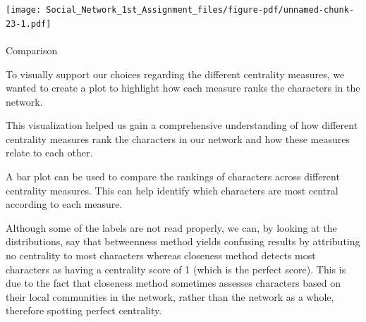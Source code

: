 \documentclass[
  letterpaper,
  DIV=11,
  numbers=noendperiod]{scrartcl}
\makeatletter
\let\oldparagraph\paragraph
\renewcommand{\paragraph}{
    \@ifstar
      \xxxParagraphStar
      \xxxParagraphNoStar
  }
\newcommand{\xxxParagraphStar}[1]{\oldparagraph*{#1}\mbox{}}
\newcommand{\xxxParagraphNoStar}[1]{\oldparagraph{#1}\mbox{}}
\newenvironment{Shaded}{\begin{snugshade}}{\end{snugshade}}
\newcommand{\AttributeTok}[1]{\textcolor[rgb]{0.40,0.45,0.13}{#1}}
\newcommand{\CommentTok}[1]{\textcolor[rgb]{0.37,0.37,0.37}{#1}}
\newcommand{\DecValTok}[1]{\textcolor[rgb]{0.68,0.00,0.00}{#1}}
\newcommand{\FloatTok}[1]{\textcolor[rgb]{0.68,0.00,0.00}{#1}}
\newcommand{\FunctionTok}[1]{\textcolor[rgb]{0.28,0.35,0.67}{#1}}
\newcommand{\NormalTok}[1]{\textcolor[rgb]{0.00,0.23,0.31}{#1}}
\newcommand{\OtherTok}[1]{\textcolor[rgb]{0.00,0.23,0.31}{#1}}
\newcommand{\SpecialCharTok}[1]{\textcolor[rgb]{0.37,0.37,0.37}{#1}}
\newcommand{\StringTok}[1]{\textcolor[rgb]{0.13,0.47,0.30}{#1}}
\makeatother
\begin{document}
\begin{Shaded}
\end{Shaded}

\texttt{[image: Social\_Network\_1st\_Assignment\_files/figure-pdf/unnamed-chunk-23-1.pdf]}

\paragraph{Comparison}\label{comparison}

To visually support our choices regarding the different centrality
measures, we wanted to create a plot to highlight how each measure ranks
the characters in the network.

This visualization helped us gain a comprehensive understanding of how
different centrality measures rank the characters in our network and how
these measures relate to each other.

A bar plot can be used to compare the rankings of characters across
different centrality measures. This can help identify which characters
are most central according to each measure.

Although some of the labels are not read properly, we can, by looking at
the distributions, say that betweenness method yields confusing results
by attributing no centrality to most characters whereas closeness method
detects most characters as having a centrality score of 1 (which is the
perfect score). This is due to the fact that closeness method sometimes
assesses characters based on their local communities in the network,
rather than the network as a whole, therefore spotting perfect
centrality.
\end{document}
